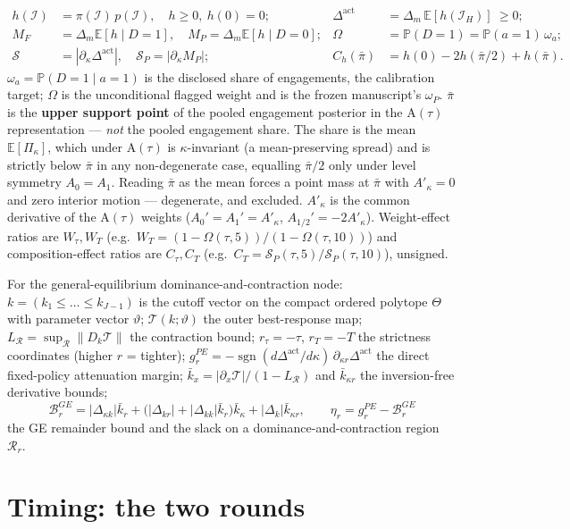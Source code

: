 \documentclass[11pt,a4paper]{article}
\newcommand{\Eop}{\mathbb{E}}
\newcommand{\Prb}{\mathbb{P}}
\newcommand{\Dact}{\Delta^{\mathrm{act}}}
\newcommand{\Tmap}{\mathcal{T}}
\newcommand{\Atau}{\mathrm{A}(\tau)}
\newcommand{\Akap}{A'_{\kappa}}
\begin{document}
\begin{align*}
h(\mathcal I)&=\pi(\mathcal I)\,p(\mathcal I), \quad h\ge0,\ h(0)=0;
&\Dact&=\Delta_m\,\Eop[h(\mathcal I_H)]\ \ge 0;\\
M_F&=\Delta_m\Eop[h\mid D=1], \quad M_P=\Delta_m\Eop[h\mid D=0];
&\Omega&=\Prb(D=1)=\Prb(a=1)\,\omega_a;\\
\mathcal S&=|\partial_\kappa\Dact|, \quad \mathcal S_P=|\partial_\kappa M_P|;
&C_h(\bar\pi)&=h(0)-2h(\bar\pi/2)+h(\bar\pi).
\end{align*}
$\omega_a=\Prb(D=1\mid a=1)$ is the disclosed share of engagements, the calibration
target; $\Omega$ is the unconditional flagged weight and is the frozen manuscript's
$\omega_P$. $\bar\pi$ is the \textbf{upper support point} of the pooled engagement
posterior in the $\Atau$ representation --- \emph{not} the pooled engagement share.
The share is the mean $\Eop[\Pi_\kappa]$, which under $\Atau$ is $\kappa$-invariant
(a mean-preserving spread) and is strictly below $\bar\pi$ in any non-degenerate
case, equalling $\bar\pi/2$ only under level symmetry $A_0=A_1$. Reading $\bar\pi$
as the mean forces a point mass at $\bar\pi$ with $\Akap=0$ and zero interior
motion --- degenerate, and excluded. $\Akap$ is the common derivative of the
$\Atau$ weights ($A_0'=A_1'=\Akap$, $A_{1/2}'=-2\Akap$). Weight-effect ratios are
$W_\tau,W_T$ (e.g.\ $W_T=(1-\Omega(\tau,5))/(1-\Omega(\tau,10))$) and
composition-effect ratios are $C_\tau,C_T$ (e.g.\
$C_T=\mathcal S_P(\tau,5)/\mathcal S_P(\tau,10)$), unsigned.

For the general-equilibrium dominance-and-contraction node:
$k=(k_1\le\dots\le k_{J-1})$ is the cutoff
vector on the compact ordered polytope $\Theta$ with parameter vector $\vartheta$;
$\Tmap(k;\vartheta)$ the outer best-response map;
$L_{\mathcal R}=\sup_{\mathcal R}\lVert D_k\Tmap\rVert$ the contraction bound;
$r_\tau=-\tau$, $r_T=-T$ the strictness coordinates (higher $r$ = tighter);
$g_r^{PE}=-\operatorname{sgn}(d\Dact/d\kappa)\,\partial_{\kappa r}\Dact$ the direct
fixed-policy attenuation margin;
$\bar k_x=|\partial_x\Tmap|/(1-L_{\mathcal R})$ and $\bar k_{\kappa r}$ the
inversion-free derivative bounds;
\[
\mathcal B_r^{GE}=|\Delta_{\kappa k}|\bar k_r
+\bigl(|\Delta_{kr}|+|\Delta_{kk}|\bar k_r\bigr)\bar k_\kappa
+|\Delta_k|\bar k_{\kappa r},
\qquad
\eta_r=g_r^{PE}-\mathcal B_r^{GE}
\]
the GE remainder bound and the slack on a dominance-and-contraction region
$\mathcal R_r$.

\section{Timing: the two rounds}
\end{document}
